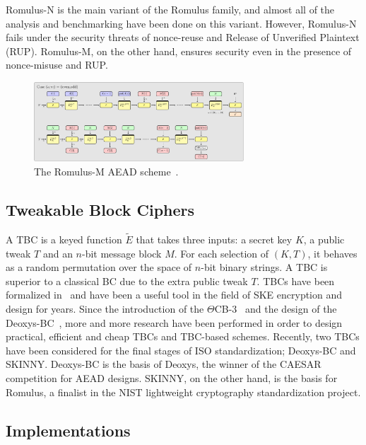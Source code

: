 \documentclass[conference]{IEEEtran}
\begin{document}
Romulus-N is the main variant of the Romulus family, and almost all of the analysis and benchmarking have been done on this variant. However, Romulus-N fails under the security threats of nonce-reuse and Release of Unverified Plaintext (RUP). Romulus-M, on the other hand, ensures security even in the presence of nonce-misuse and RUP.

\begin{figure}[!t]
  \centering
  \includegraphics[width=0.7\textwidth]{figures/modeM_simplified.pdf}
  \caption{The Romulus-M AEAD scheme~\cite{romulus_site}.}\label{fig:romulusm}
\end{figure}

\subsection{Tweakable Block Ciphers}

A TBC is a keyed function $\tilde{E}$ that takes three inputs: a secret key $K$, a public tweak $T$ and an $n$-bit message block $M$. For each selection of $(K,T)$, it behaves as a random permutation over the space of $n$-bit binary strings. A TBC is superior to a classical BC due to the extra public tweak $T$. TBCs have been formalized in~\cite{liskov2002tweakable} and have been a useful tool in the field of SKE encryption and design for years. Since the introduction of the $\Theta$CB-3~\cite{krovetz2011software} and the design of the Deoxys-BC~\cite{jean2016deoxys}, more and more research have been performed in order to design practical, efficient and cheap TBCs and TBC-based schemes. Recently, two TBCs have been considered for the final stages of ISO standardization; Deoxys-BC and SKINNY. Deoxys-BC is the basis of Deoxys, the winner of the CAESAR competition for AEAD designs. SKINNY, on the other hand, is the basis for Romulus, a finalist in the NIST lightweight cryptography standardization project.

\subsection{Implementations}
\end{document}
